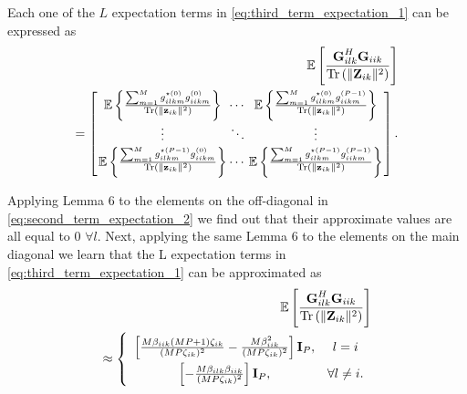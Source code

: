 \documentclass[journal,12pt,onecolumn]{IEEEtran}
\DeclareMathOperator{\Tr}{Tr}
\begin{document}
Each one of the $L$ expectation terms in \eqref{eq:third_term_expectation_1} can be expressed as
\begin{equation}\label{eq:second_term_expectation_2}
\begin{split}
\mathbb{E} \left[ \frac{ \textbf{G}_{ilk}^{H} \textbf{G}_{iik}}{\Tr \left( \lVert \textbf{Z}_{ik} \rVert^{2} \right)} \right] \\ = 
\arraycolsep=1pt\def\arraystretch{1.5}
\left[\begin{array}{ccc} \mathbb{E} \left\lbrace \frac{\sum_{m=1}^{M} g_{ilkm}^{\star (0)} g_{iikm}^{(0)} }{\Tr \left( \lVert \textbf{z}_{ik} \rVert^{2} \right)} \right\rbrace & \cdots & \mathbb{E} \left\lbrace \frac{\sum_{m=1}^{M} g_{ilkm}^{\star (0)}g_{iikm}^{(P-1)} }{\Tr \left( \lVert \textbf{z}_{ik} \rVert^{2} \right)} \right\rbrace \\
\vdots & \ddots & \vdots \\
\mathbb{E} \left\lbrace \frac{\sum_{m=1}^{M} g_{ilkm}^{\star(P-1)}g_{iikm}^{(0)} }{\Tr \left( \lVert \textbf{z}_{ik} \rVert^{2} \right)}\right\rbrace & \cdots & \mathbb{E} \left\lbrace \frac{\sum_{m=1}^{M} g_{ilkm}^{\star (P-1)}g_{iikm}^{(P-1)} }{\Tr \left( \lVert \textbf{z}_{ik} \rVert^{2} \right)} \right\rbrace
\end{array} \right].
\end{split}
\end{equation}

Applying Lemma 6 to the elements on the off-diagonal in \eqref{eq:second_term_expectation_2} we find out that their approximate values are all equal to 0 $\forall l$. Next, applying the same Lemma 6 to the elements on the main diagonal we learn that the L expectation terms in \eqref{eq:third_term_expectation_1} can be approximated as
\begin{equation}\label{eq:second_term_expectation_3}
\begin{split}
\mathbb{E} \left[ \frac{ \textbf{G}_{ilk}^{H} \textbf{G}_{iik}}{\Tr \left( \lVert \textbf{Z}_{ik} \rVert^{2} \right)} \right] \\ \approx \left\{
\def\arraystretch{1.7}
\begin{array}{cc}
\left[ \frac{M\beta_{iik}(MP+1) \zeta_{ik}}{(MP \zeta_{ik})^{2}} - \frac{M \beta_{iik}^{2}}{(MP \zeta_{ik})^{2}} \right] \textbf{I}_{P},  & l = i\\
\left[-\frac{M \beta_{ilk} \beta_{iik}}{(MP \zeta_{ik})^{2}} \right] \textbf{I}_{P}, & \forall l \neq i.
\end{array}\right.
\end{split}
\end{equation}
\end{document}
